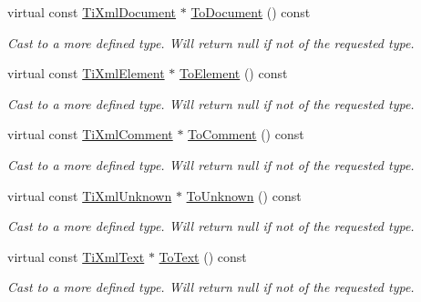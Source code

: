 \begin{DoxyCompactItemize}
\mbox{\label{classTiXmlNode_a775a904618cad6e4a8049bda4f5a6aa9}} 
virtual const \hyperlink{classTiXmlDocument}{Ti\+Xml\+Document} $\ast$ \hyperlink{classTiXmlNode_a775a904618cad6e4a8049bda4f5a6aa9}{To\+Document} () const
\begin{DoxyCompactList}\small\item\em Cast to a more defined type. Will return null if not of the requested type. \end{DoxyCompactList}\item 
\mbox{\label{classTiXmlNode_a4080428f2cac46e92ef4d284202fad0b}} 
virtual const \hyperlink{classTiXmlElement}{Ti\+Xml\+Element} $\ast$ \hyperlink{classTiXmlNode_a4080428f2cac46e92ef4d284202fad0b}{To\+Element} () const
\begin{DoxyCompactList}\small\item\em Cast to a more defined type. Will return null if not of the requested type. \end{DoxyCompactList}\item 
\mbox{\label{classTiXmlNode_a5ad43b9d545315e9bb4f50d4cb70de9e}} 
virtual const \hyperlink{classTiXmlComment}{Ti\+Xml\+Comment} $\ast$ \hyperlink{classTiXmlNode_a5ad43b9d545315e9bb4f50d4cb70de9e}{To\+Comment} () const
\begin{DoxyCompactList}\small\item\em Cast to a more defined type. Will return null if not of the requested type. \end{DoxyCompactList}\item 
\mbox{\label{classTiXmlNode_ab4f2e6ce87d36c1b9b7de2529128a460}} 
virtual const \hyperlink{classTiXmlUnknown}{Ti\+Xml\+Unknown} $\ast$ \hyperlink{classTiXmlNode_ab4f2e6ce87d36c1b9b7de2529128a460}{To\+Unknown} () const
\begin{DoxyCompactList}\small\item\em Cast to a more defined type. Will return null if not of the requested type. \end{DoxyCompactList}\item 
\mbox{\label{classTiXmlNode_a2591700660b308571c09166559a39332}} 
virtual const \hyperlink{classTiXmlText}{Ti\+Xml\+Text} $\ast$ \hyperlink{classTiXmlNode_a2591700660b308571c09166559a39332}{To\+Text} () const
\begin{DoxyCompactList}\small\item\em Cast to a more defined type. Will return null if not of the requested type. \end{DoxyCompactList}\item 

\end{DoxyCompactItemize}
